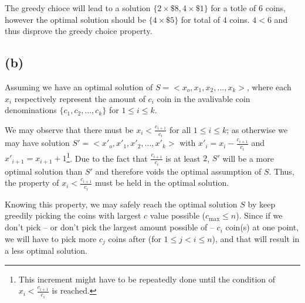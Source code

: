 \documentclass[11pt]{article}
\begin{document}
The greedy chioce will lead to a solution $\{2 \times \$8, 4 \times \$1\}$ for a totle of $6$ coins, however the optimal solution should be $\{4 \times \$5\}$ for total of $4$ coins. $4 < 6$ and thus disprove the greedy choice property.

\subsection{(b)}

Assuming we have an optimal solution of $S = <x_o, x_1, x_2, ..., x_k>$, where each $x_i$ respectively represent the amount of $c_i$ coin in the avalivable coin denominations $\{c_1, c_2, ..., c_k\}$ for $1 \leq i \leq k$.

We may observe that there must be $x_i < \frac{c_{i+1}}{c_i}$ for all $1 \leq i \leq k$; as otherwise we may have solution $S' = <x'_o, x'_1, x'_2, ..., x'_k>$ with $x'_i = x_i - \frac{c_{i+1}}{c_i}$ and $x'_{i+1} = x_{i+1} + 1$\footnote{This increment might have to be repeatedly done until the condition of $x_i < \frac{c_{i+1}}{c_i}$ is reached.}. Due to the fact that $\frac{c_{i+1}}{c_i}$ is at least $2$, $S'$ will be a more optimal solution than $S'$ and therefore voids the optimal assumption of $S$. Thus, the property of $x_i < \frac{c_{i+1}}{c_i}$ must be held in the optimal solution.

Knowing this property, we may safely reach the optimal solution $S$ by keep greedily picking the coins with largest $c$ value possible ($c_{\text{max}} \leq n$). Since if we don't pick -- or don't pick the largest amount possible of -- $c_i$ coin(s) at one point, we will have to pick more $c_j$ coins after (for $1 \leq j < i \leq n$), and that will result in a less optimal solution.

%
% 
% 
\end{document}
